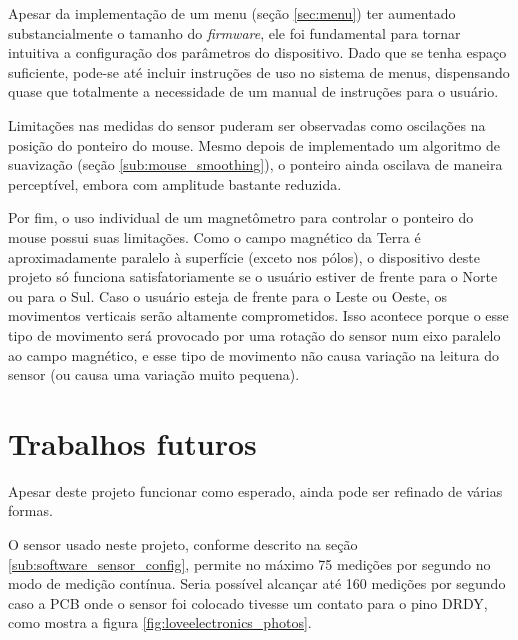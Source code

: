\documentclass[brazil,pagestart=firstchapter]{abnt}
\begin{document}
Apesar da implementação de um menu (seção \ref{sec:menu}) ter aumentado
substancialmente o tamanho do \textit{firmware}, ele foi fundamental para
tornar intuitiva a configuração dos parâmetros do dispositivo. Dado que se
tenha espaço suficiente, pode-se até incluir instruções de uso no sistema de
menus, dispensando quase que totalmente a necessidade de um manual de
instruções para o usuário.



Limitações nas medidas do sensor puderam ser observadas como oscilações na
posição do ponteiro do mouse. Mesmo depois de implementado um algoritmo de
suavização (seção \ref{sub:mouse_smoothing}), o ponteiro ainda oscilava de
maneira perceptível, embora com amplitude bastante reduzida.

Por fim, o uso individual de um magnetômetro para controlar o ponteiro do
mouse possui suas limitações. Como o campo magnético da Terra é
aproximadamente paralelo à superfície (exceto nos pólos), o dispositivo
deste projeto só funciona satisfatoriamente se o usuário estiver de frente
para o Norte ou para o Sul. Caso o usuário esteja de frente para o Leste ou
Oeste, os movimentos verticais serão altamente comprometidos. Isso acontece
porque o esse tipo de movimento será provocado por uma rotação do sensor num
eixo paralelo ao campo magnético, e esse tipo de movimento não causa
variação na leitura do sensor (ou causa uma variação muito pequena).


\section{Trabalhos futuros}
\label{sec:trabalhos_futuros}

Apesar deste projeto funcionar como esperado, ainda pode ser refinado de
várias formas.

O sensor usado neste projeto, conforme descrito na seção
\ref{sub:software_sensor_config}, permite no máximo 75 medições por segundo
no modo de medição contínua. Seria possível alcançar até 160 medições por
segundo caso a \ac{PCB} onde o sensor foi colocado tivesse um contato para o
pino DRDY, como mostra a figura \ref{fig:loveelectronics_photos}.
\end{document}
